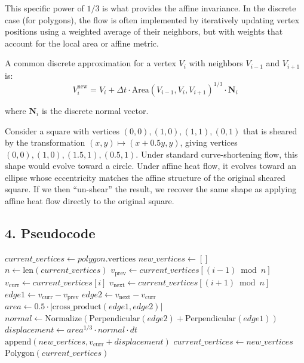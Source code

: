 This specific power of $1/3$ is what provides the affine invariance. In the discrete case (for polygons), the flow is often implemented by iteratively updating vertex positions using a weighted average of their neighbors, but with weights that account for the local area or affine metric.

A common discrete approximation for a vertex $V_i$ with neighbors $V_{i-1}$ and $V_{i+1}$ is:
$$V_i^{\text{new}} = V_i + \Delta t \cdot \text{Area}(V_{i-1}, V_i, V_{i+1})^{1/3} \cdot \mathbf{N}_i$$

where $\mathbf{N}_i$ is the discrete normal vector.

\begin{example}\label{ex:affine_heat}
Consider a square with vertices $(0,0), (1,0), (1,1), (0,1)$ that is sheared by the transformation $(x,y) \mapsto (x + 0.5y, y)$, giving vertices $(0,0), (1,0), (1.5,1), (0.5,1)$. Under standard curve-shortening flow, this shape would evolve toward a circle. Under affine heat flow, it evolves toward an ellipse whose eccentricity matches the affine structure of the original sheared square. If we then ``un-shear'' the result, we recover the same shape as applying affine heat flow directly to the original square.
\end{example}

\subsection{4. Pseudocode}

\begin{algorithm}
\caption{Affine Polygon Smoothing}
\label{alg:affine_polygon_smoothing}
\begin{algorithmic}[1]
    \State $current\_vertices \gets polygon.\text{vertices}$
        \State $new\_vertices \gets []$
        \State $n \gets \text{len}(current\_vertices)$
            \State $v_{\text{prev}} \gets current\_vertices[(i - 1) \bmod n]$
            \State $v_{\text{curr}} \gets current\_vertices[i]$
            \State $v_{\text{next}} \gets current\_vertices[(i + 1) \bmod n]$
            \State $edge1 \gets v_{\text{curr}} - v_{\text{prev}}$
            \State $edge2 \gets v_{\text{next}} - v_{\text{curr}}$
            \State $area \gets 0.5 \cdot |\text{cross\_product}(edge1, edge2)|$
            \State $normal \gets \text{Normalize}\left(\text{Perpendicular}(edge2) + \text{Perpendicular}(edge1)\right)$
            \State $displacement \gets area^{1/3} \cdot normal \cdot dt$
            \State $\text{append}(new\_vertices, v_{\text{curr}} + displacement)$
        \EndFor
        \State $current\_vertices \gets new\_vertices$
    \EndFor
    \State \Return $\text{Polygon}(current\_vertices)$
\EndFunction
\end{algorithmic}
\end{algorithm}


